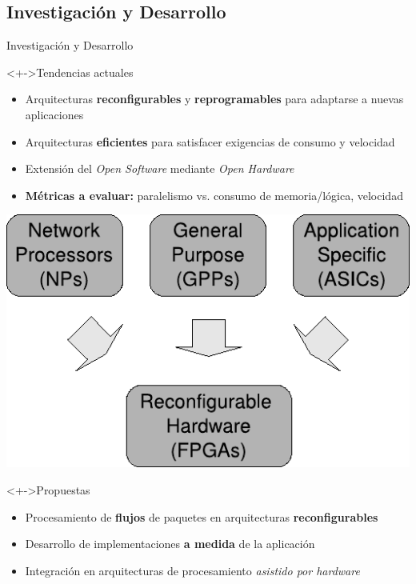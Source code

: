 \documentclass[xcolor=dvipsnames]{beamer}
\begin{document}
\subsection{Investigación y Desarrollo}
\begin{frame}{Investigación y Desarrollo}
  \begin{block}<+->{Tendencias actuales} 
    \begin{itemize}
      \item Arquitecturas {\bf reconfigurables} y {\bf reprogramables} para adaptarse a nuevas aplicaciones
      \item Arquitecturas {\bf eficientes} para satisfacer exigencias de consumo y velocidad
      \item Extensión del \emph{Open Software} mediante \emph{Open Hardware}
      \item {\bf Métricas a evaluar:} paralelismo vs. consumo de memoria/lógica, velocidad
    \end{itemize}
      
     \center
     \includegraphics[scale=0.4]{figures/implementation}
  \end{block}
  
  
  \begin{block}<+->{Propuestas}  
    \begin{itemize}
      \item Procesamiento de {\bf flujos} de paquetes en arquitecturas {\bf reconfigurables}
      \item Desarrollo de implementaciones {\bf a medida} de la aplicación
      \item Integración en arquitecturas de procesamiento \emph{asistido por hardware}
    \end{itemize}
  \end{block}

\end{frame}
\end{document}
